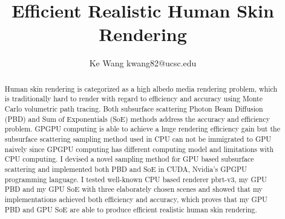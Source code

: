 \documentclass[letterpaper,12pt]{article}
\begin{document}
\title{Efficient Realistic Human Skin Rendering}
\author{Ke Wang \space\space\space kwang82@ucsc.edu}
\date{}
\maketitle

\begin{abstract}
Human skin rendering is categorized as a high albedo media rendering problem, which is traditionally hard to render with regard to efficiency and accuracy using Monte Carlo volumetric path tracing. Both subsurface scattering Photon Beam Diffusion (PBD)\cite{habel2013photon} and Sum of Exponentials (SoE)\cite{christensen2015approximate} methods address the accuracy and efficiency problem. GPGPU computing is able to achieve a huge rendering efficiency gain but the subsurface scattering sampling method used in CPU can not be immigrated to GPU naively since GPGPU computing has different computing model and limitations with CPU computing. I devised a novel sampling method for GPU based subsurface scattering and implemented both PBD and SoE in CUDA, Nvidia's GPGPU programming language\cite{han2011hicuda}. I tested well-known CPU based renderer pbrt-v3\cite{pharr2016physically}, my GPU PBD and my GPU SoE with three elaborately chosen scenes and showed that my implementations achieved both efficiency and accuracy, which proves that my GPU PBD and GPU SoE are able to produce efficient realistic human skin rendering.
\end{abstract}
\end{document}
